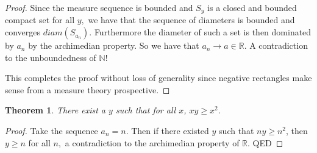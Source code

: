\documentclass[letter]{article}
\newtheorem{theorem}{Theorem}
\newenvironment{menumerate}{%
  \edef\backupindent{\the\parindent}%
  \enumerate%
  \setlength{\parindent}{\backupindent}%
}{\endenumerate}
\begin{document}
\begin{menumerate}
\begin{menumerate}
\begin{proof}
          Since the measure sequence is bounded and $S_y$ is a closed and bounded compact set
          for all $y,$ we have that the sequence of diameters is bounded and converges $diam(S_{a_n})$.
          Furthermore the diameter of such a set is then dominated by $a_n$ by the archimedian property.
          So we have that $a_n \to a \in \mathbb{R}.$ A contradiction  to the unboundedness of $\mathbb{N}!$

          This completes the proof without loss of generality since negative rectangles make sense from
          a measure theory prospective. 
        \end{proof}
        \item 
        \begin{theorem}
          There exist a $y$ such that for all $x$, $xy \geq x^2.$
        \end{theorem}
        \begin{proof}
          Take the sequence $a_n = n.$ Then if there existed $y$ such that $ny \geq n^2$, then $y \geq n$ for all $n,$
          a contradiction to the archimedian property of $\mathbb{R}.$ QED
        \end{proof}
    \end{menumerate}


\end{menumerate}
\end{document}
